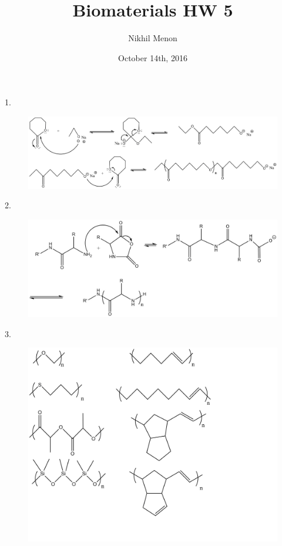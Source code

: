 \documentclass{article}
\title{Biomaterials HW 5}
\author{Nikhil Menon}
\date{October 14th, 2016}
\begin{document}
\maketitle

1. \begin{figure}[h]
\centering
\includegraphics[scale=0.3]{P1.png}
\end{figure}

2. \begin{figure}[h]
\centering
\includegraphics[scale=0.4]{P2.png}
\end{figure}
\vspace{50mm}

3. \begin{figure}[h]
\centering
\includegraphics[scale=0.25]{P3.png}
\end{figure}
\end{document}
